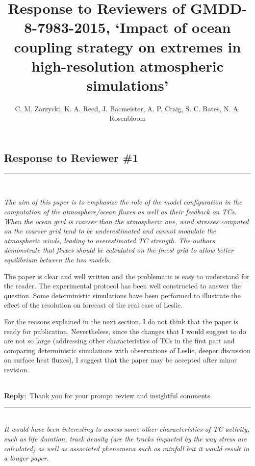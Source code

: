 \documentclass{article}
\newcommand{\genDisc}[1]{\medskip \hrule \noindent \\
               {\itshape #1}}
\newcommand{\reply}{\noindent \\ \textbf{Reply}:\ }
\begin{document}
\title{Response to Reviewers of GMDD-8-7983-2015, `Impact of ocean coupling strategy on extremes in high-resolution atmospheric simulations'}
\author{C. M. Zarzycki, K. A. Reed, J. Bacmeister, A. P. Craig, S. C. Bates, N. A. Rosenbloom}

\maketitle

\subsection*{Response to Reviewer \#1}

\genDisc{The aim of this paper is to emphasize the role of the model configuration in the computation of the atmosphere/ocean fluxes as well as their feedback on TCs. When the ocean grid is coarser than the atmospheric one, wind stresses computed on the coarser grid tend to be underestimated and cannot modulate the atmospheric winds, leading to overestimated TC strength. The authors demonstrate that fluxes should be calculated on the finest grid to allow better equilibrium between the two models.

The paper is clear and well written and the problematic is easy to understand for the reader. The experimental protocol has been well constructed to answer the question. Some deterministic simulations have been performed to illustrate the effect of the resolution on forecast of the real case of Leslie.

For the reasons explained in the next section, I do not think that the paper is ready for publication. Nevertheless, since the changes that I would suggest to do are not so large (addressing other characteristics of TCs in the first part and comparing deterministic simulations with observations of Leslie, deeper discussion on surface heat fluxes), I suggest that the paper may be accepted after minor revision.}

\reply{Thank you for your prompt review and insightful comments.}

\genDisc{It would have been interesting to assess some other characteristics of TC activity, such as life duration, track density (are the tracks impacted by the way stress are calculated) as well as associated phenomena such as rainfall but it would result in a longer paper.}
\end{document}
